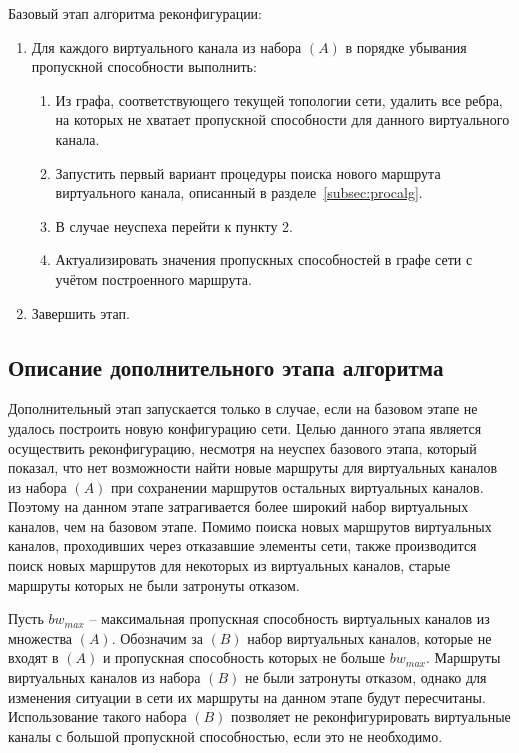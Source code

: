 \documentclass[12pt, a4paper]{article}
\begin{document}
Базовый этап алгоритма реконфигурации:
\begin{enumerate}
	\item Для каждого виртуального канала из набора $(A)$ в порядке убывания пропускной способности выполнить:
	\begin{enumerate}
	\item Из графа, соответствующего текущей топологии сети, удалить все ребра, на которых не хватает пропускной способности для данного виртуального канала.
	\item Запустить первый вариант процедуры поиска нового маршрута виртуального канала, описанный в разделе~\ref{subsec:procalg}.
	\item В случае неуспеха перейти к пункту 2.
	\item Актуализировать значения пропускных способностей в графе сети с учётом построенного маршрута.
	\end{enumerate}
	\item Завершить этап.
\end{enumerate}

\subsection{Описание дополнительного этапа алгоритма}
Дополнительный этап запускается только в случае, если на базовом этапе не удалось построить новую конфигурацию сети. Целью данного этапа является осуществить реконфигурацию, несмотря на неуспех базового этапа, который показал, что нет возможности найти новые маршруты для виртуальных каналов из набора $(A)$ при сохранении маршрутов остальных виртуальных каналов. Поэтому на данном этапе затрагивается более широкий набор виртуальных каналов, чем на базовом этапе. Помимо поиска новых маршрутов виртуальных каналов, проходивших через отказавшие элементы сети, также производится поиск новых маршрутов для некоторых из виртуальных каналов, старые маршруты которых не были затронуты отказом.

Пусть $bw_{max}$ -- максимальная пропускная способность виртуальных каналов из множества $(A)$.
Обозначим за $(B)$ набор виртуальных каналов, которые не входят в $(A)$ и пропускная способность которых не больше $bw_{max}$. Маршруты виртуальных каналов из набора $(B)$ не были затронуты отказом, однако для изменения ситуации в сети их маршруты на данном этапе будут пересчитаны. Использование такого набора $(B)$ позволяет не реконфигурировать виртуальные каналы с большой пропускной способностью, если это не необходимо.
\end{document}
